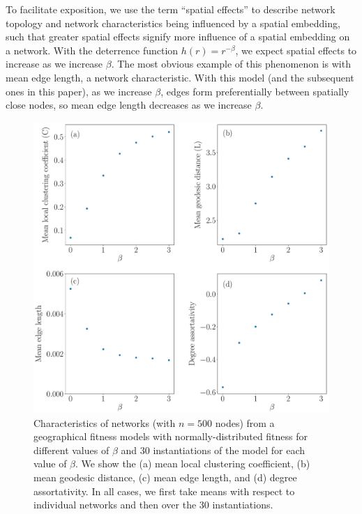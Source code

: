 \documentclass[%
 reprint,
 amsmath,amssymb,
 aps,
]{revtex4-1}
\begin{document}
To facilitate exposition, 
we use the term ``spatial effects'' to describe network topology and network characteristics being influenced by a spatial embedding, such that greater spatial effects signify more influence of a spatial embedding on a network.
With the deterrence function $h(r) = r^{-\beta}$, we expect spatial effects to increase as we increase $\beta$. The most obvious example of this phenomenon is with mean edge length, a network characteristic. With this model (and the subsequent ones in this paper), as we increase $\beta$, edges form preferentially between spatially close nodes, so mean edge length decreases as we increase $\beta$. 


\begin{figure}
    \centering
    \includegraphics[width=1.0\linewidth]{geographical_network_metrics3.pdf}
    \caption{Characteristics of networks (with $n = 500$ nodes) from a geographical fitness models with normally-distributed fitness for different values of $\beta$ and $30$ instantiations of the model for each value of $\beta$. We show the (a) mean local clustering coefficient, (b) mean geodesic distance, (c) mean edge length, and (d) degree assortativity. In all cases, we first take means with respect to individual networks and then over the $30$ instantiations.
    }
\end{figure}
\end{document}
